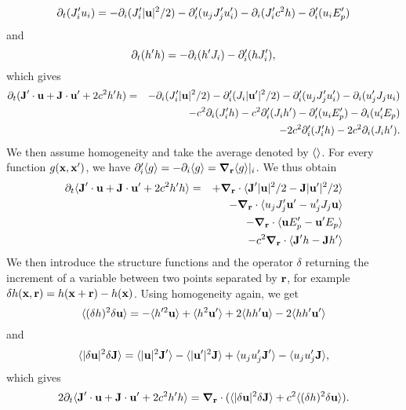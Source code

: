 \begin{equation}
\partial_t ( J_i' u_i ) = - \partial_i( J_i'|\textbf{u}|^2/2) - \partial_i'(u_j J_j' u_i')
-\partial_i (J_i' c^2 h)  - \partial_i' (u_i E_p')
\end{equation}
and
\begin{equation}
\partial_t ( h' h ) = - \partial_i( h'J_i ) - \partial_i'( hJ_i' ),
\end{equation}
which gives
\begin{eqnarray}
\p_t ( \JJ'\cdot\uu + \JJ\cdot\uu' + 2c^2 h'h )
&=& - \p_i( J_i'|\uu|^2/2) - \p_i'( J_i|\uu'|^2/2) %
- \p_i'(u_j J_j' u_i') - \p_i(u_j' J_j u_i) \nonumber\\
&& -c^2\p_i (J_i'h) - c^2\p_i' (J_ih') %
- \p_i' (u_i E_p') - \p_i (u_i' E_p) \nonumber\\
&& -2c^2\p_i' (J_i'h) - 2c^2\p_i (J_ih').
\end{eqnarray}
We then assume homogeneity and take the average denoted by
$\langle  \rangle$.   For
every function $g(\textbf{x}, \textbf{x}')$, we have $\partial_i' \langle g \rangle =
-\partial_i\langle g \rangle = \boldsymbol{\nabla}_{\textbf{r}} \langle g \rangle|_i$. We thus obtain
\begin{eqnarray}
\partial_t \langle  \textbf{J}'\cdot\textbf{u} + \textbf{J}\cdot\textbf{u}' + 2c^2 h'h  \rangle
&=& + \boldsymbol{\nabla}_{\textbf{r}}\cdot\langle  \textbf{J}'|\textbf{u}|^2/2 - \textbf{J}|\textbf{u}'|^2/2  \rangle \nonumber\\
&& - \boldsymbol{\nabla}_{\textbf{r}}\cdot\langle  u_j J_j' \textbf{u}' - u_j' J_j \textbf{u}  \rangle \nonumber\\
&& - \boldsymbol{\nabla}_{\textbf{r}}\cdot\langle  \textbf{u} E_p'- \textbf{u}' E_p  \rangle \nonumber\\
&& -c^2\boldsymbol{\nabla}_{\textbf{r}}\cdot\langle  \textbf{J}'h - \textbf{J} h'  \rangle
\end{eqnarray}
%
We then introduce the structure functions and the operator $\delta$
returning the increment of a variable between two points separated by $\textbf{r}$,
for example $\delta h (\textbf{x}, \textbf{r}) = h(\textbf{x}+\textbf{r})- h(\textbf{x})$.
%
Using homogeneity again, we get
\begin{equation}
\langle  (\delta h)^2 \delta\textbf{u}  \rangle =
-\langle  h'^2 \textbf{u}  \rangle + \langle  h^2 \textbf{u}'  \rangle
+2\langle  hh' \textbf{u}  \rangle - 2\langle  hh' \textbf{u}'  \rangle
\end{equation}
and
\begin{equation}
\langle  |\delta \textbf{u}|^2 \delta\textbf{J}  \rangle =
\langle   |\textbf{u}|^2 \textbf{J}'  \rangle - \langle  |\textbf{u}'|^2\textbf{J}  \rangle
+\langle  u_ju_j' \textbf{J}'  \rangle - \langle   u_ju_j' \textbf{J}  \rangle,
\end{equation}
which gives
\begin{equation}
2\partial_t \langle  \textbf{J}'\cdot\textbf{u} + \textbf{J}\cdot\textbf{u}' + 2c^2 h'h  \rangle
= \boldsymbol{\nabla}_{\textbf{r}} \cdot ( \langle  |\delta \textbf{u}|^2 \delta\textbf{J}  \rangle
+ c^2\langle  (\delta h)^2 \delta\textbf{u}  \rangle ).
\end{equation}
